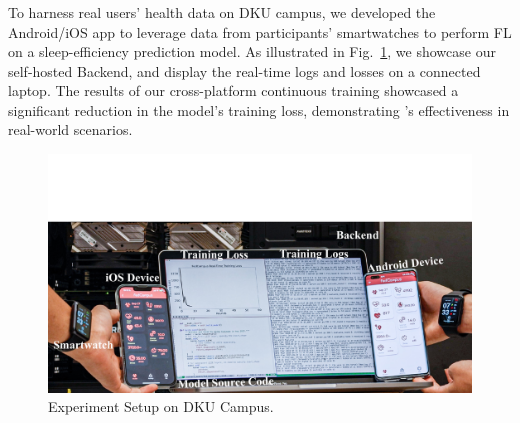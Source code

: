 \documentclass[conference]{IEEEtran}
\begin{document}
\subsubsection{\FedCampus{}}
To harness real users' health data on DKU campus,
we developed the \FedCampus{} Android/iOS app to leverage data from
participants' smartwatches to perform FL on
a sleep-efficiency prediction model.
As illustrated in Fig.~\ref{fig:fedcampus},
we showcase our self-hosted Backend,
and display the real-time logs and losses on a connected laptop.
The results of our cross-platform continuous training showcased
a significant reduction in the model's training loss,
demonstrating \FedKit{}'s effectiveness in real-world scenarios.

\begin{figure}
    \centering
    \includegraphics*[width=0.9\linewidth]{fedcampus.pdf}
    \caption{\FedCampus{} Experiment Setup on DKU Campus.}
    \label{fig:fedcampus}
\end{figure}



\end{document}
